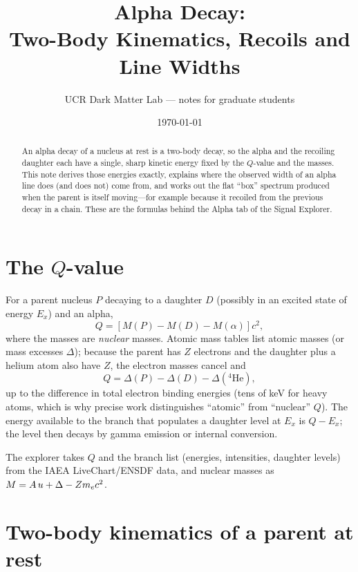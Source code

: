 
\title{Alpha Decay:\\ Two-Body Kinematics, Recoils and Line Widths}
\author{UCR Dark Matter Lab --- notes for graduate students}
\date{\today}

\maketitle
\seriesnote

\begin{abstract}
An alpha decay of a nucleus at rest is a two-body decay, so the alpha and the recoiling daughter each have a single, sharp kinetic energy fixed by the $Q$-value and the masses. This note derives those energies exactly, explains where the observed width of an alpha line does (and does not) come from, and works out the flat ``box'' spectrum produced when the parent is itself moving---for example because it recoiled from the previous decay in a chain. These are the formulas behind the Alpha tab of the Signal Explorer.
\end{abstract}
\tableofcontents

\section{The $Q$-value}
For a parent nucleus $P$ decaying to a daughter $D$ (possibly in an excited state of energy $E_x$) and an alpha,
\begin{equation}
Q = \left[M(P) - M(D) - M(\alpha)\right]c^2,
\end{equation}
where the masses are \emph{nuclear} masses. Atomic mass tables list atomic masses (or mass excesses $\Delta$); because the parent has $Z$ electrons and the daughter plus a helium atom also have $Z$, the electron masses cancel and
\begin{equation}
Q = \Delta(P) - \Delta(D) - \Delta({}^4\mathrm{He}),
\end{equation}
up to the difference in total electron binding energies (tens of keV for heavy atoms, which is why precise work distinguishes ``atomic'' from ``nuclear'' $Q$). The energy available to the branch that populates a daughter level at $E_x$ is $Q - E_x$; the level then decays by gamma emission or internal conversion.

The explorer takes $Q$ and the branch list (energies, intensities, daughter levels) from the IAEA LiveChart/ENSDF data, and nuclear masses as $M = A\,u + \Delta - Zm_e c^2$.

\section{Two-body kinematics of a parent at rest}
